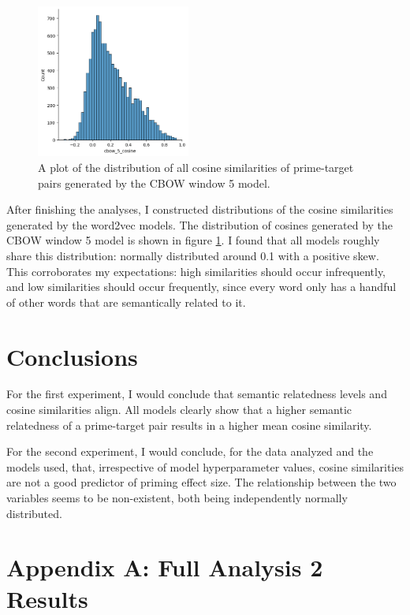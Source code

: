 \documentclass{IEEEtran}
\begin{document}
\begin{figure}
    \centering
    \includegraphics[width=0.45\textwidth]{images/distribution_cbow_5_cosine.png}
    \caption{A plot of the distribution of all cosine similarities of prime-target pairs generated by the CBOW window 5 model.}
    \label{fig:cosine_cbow_5_distribution}
\end{figure}

After finishing the analyses, I constructed distributions of the cosine similarities generated by the word2vec models.
The distribution of cosines generated by the CBOW window 5 model is shown in figure \ref{fig:cosine_cbow_5_distribution}.
I found that all models roughly share this distribution: normally distributed around 0.1 with a positive skew.
This corroborates my expectations: high similarities should occur infrequently, and low similarities should occur frequently, since every word only has a handful of other words that are semantically related to it.

\section{Conclusions}
For the first experiment, I would conclude that semantic relatedness levels and cosine similarities align.
All models clearly show that a higher semantic relatedness of a prime-target pair results in a higher mean cosine similarity.

For the second experiment, I would conclude, for the data analyzed and the models used, that, irrespective of model hyperparameter values, cosine similarities are not a good predictor of priming effect size.
The relationship between the two variables seems to be non-existent, both being independently normally distributed.

\onecolumn
\appendix
\section*{Appendix A: Full Analysis 2 Results}
\end{document}
